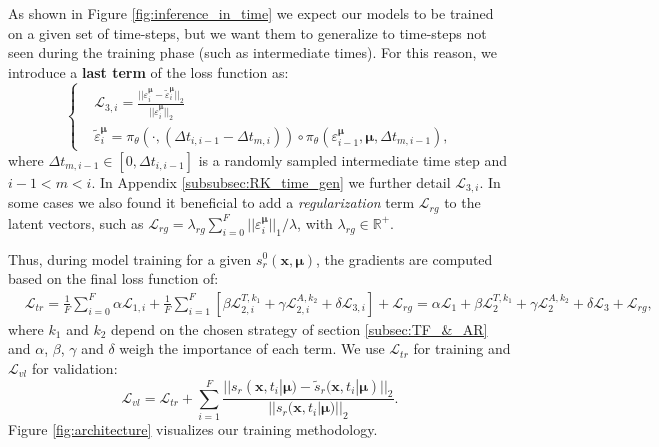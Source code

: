 As shown in Figure \ref{fig:inference_in_time} we expect our models to be trained on a given set of time-steps, but we want them to generalize to time-steps not seen during the training phase (such as intermediate times). For this reason, we introduce a \textbf{last term} of the loss function as:
\begin{equation}
\label{eq:L3}
    \left\{
    \begin{aligned}
    &\mathcal{L}_{3,i} =\frac{||\varepsilon_i^{\pmb{\mu}}-\tilde{\varepsilon}_{i}^{\pmb{\mu}}||_2}{||\varepsilon_i^{\pmb{\mu}}||_2}\ \\ &\tilde{\varepsilon}_{i}^{\pmb{\mu}} = \pi_\theta(\cdot,(\Delta t_{i,i-1}-\Delta t_{m,i}))\circ\pi_\theta(\varepsilon_{i-1}^{\pmb{\mu}},\pmb{\mu},\Delta t_{m,i-1}),
    \end{aligned}
    \right.
\end{equation}
where $\Delta t_{m,i-1}\in[0,\Delta t_{i,i-1}]$ is a randomly sampled intermediate time step and $i-1<m<i$. In Appendix \ref{subsubsec:RK_time_gen} we further detail $\mathcal{L}_{3,i}$. In some cases we also found it beneficial to add a \textit{regularization} term $\mathcal{L}_{rg}$ to the latent vectors, such as $\mathcal{L}_{rg} = \lambda_{rg}\sum_{i=0}^F ||\varepsilon_i^{\pmb{\mu}}||_1/\lambda$, with $\lambda_{rg}\in\mathbb{R}^+$. 

Thus, during model training for a given $s_r^0(\mathbf{x},\pmb{\mu})$, the gradients are computed based on the final loss function of:
\begin{equation}
    \begin{aligned}
    &\mathcal{L}_{tr} = \frac{1}{F}\sum_{i=0}^F \alpha \mathcal{L}_{1,i}+\frac{1}{F}\sum_{i=1}^{F}\left[\beta\mathcal{L}_{2,i}^{T,k_1}+\gamma\mathcal{L}_{2,i}^{A,k_2}+\delta\mathcal{L}_{3,i}\right]+ \mathcal{L}_{rg} = \alpha \mathcal{L}_{1}+\beta\mathcal{L}_{2}^{T,k_1}+\gamma\mathcal{L}_{2}^{A,k_2}+\delta\mathcal{L}_{3} + \mathcal{L}_{rg},
    \end{aligned}
\end{equation}
where $k_1$ and $k_2$ depend on the chosen strategy of section \ref{subsec:TF_&_AR} and $\alpha$, $\beta$, $\gamma$ and $\delta$ weigh the importance of each term.  We use $\mathcal{L}_{tr}$ for training and $\mathcal{L}_{vl}$ for validation:
\begin{equation}
    \mathcal{L}_{vl} = \mathcal{L}_{tr} + \sum_{i=1}^{F} \frac{||s_r(\mathbf{x},t_i|\pmb{\mu}) - \tilde{s}_r(\mathbf{x},t_i|\pmb{\mu})||_2}{||s_r(\mathbf{x},t_i|\pmb{\mu})||_2}.
\end{equation}
Figure \ref{fig:architecture} visualizes our training methodology.

